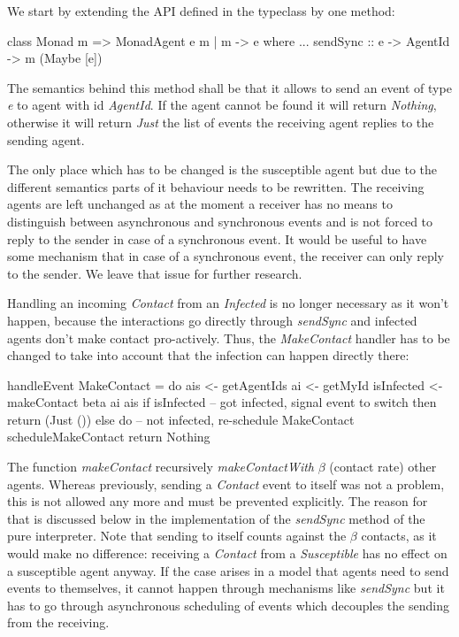 We start by extending the API defined in the typeclass by one method:

\begin{HaskellCode}
class Monad m => MonadAgent e m | m -> e where
  ...
  sendSync :: e -> AgentId -> m (Maybe [e])
\end{HaskellCode}

The semantics behind this method shall be that it allows to send an event of type \textit{e} to agent with id \textit{AgentId}. If the agent cannot be found it will return \textit{Nothing}, otherwise it will return \textit{Just} the list of events the receiving agent replies to the sending agent. 

The only place which has to be changed is the susceptible agent but due to the different semantics parts of it behaviour needs to be rewritten. The receiving agents are left unchanged as at the moment a receiver has no means to distinguish between asynchronous and synchronous events and is not forced to reply to the sender in case of a synchronous event. It would be useful to have some mechanism that in case of a synchronous event, the receiver can only reply to the sender. We leave that issue for further research.

Handling an incoming \textit{Contact} from an \textit{Infected} is no longer necessary as it won't happen, because the interactions go directly through \textit{sendSync} and infected agents don't make contact pro-actively. Thus, the \textit{MakeContact} handler has to be changed to take into account that the infection can happen directly there:

\begin{HaskellCode}
handleEvent MakeContact = do
  ais        <- getAgentIds
  ai         <- getMyId
  isInfected <- makeContact beta ai ais
  if isInfected
    -- got infected, signal event to switch
    then return (Just ())
    else do
      -- not infected, re-schedule MakeContact
      scheduleMakeContact
      return Nothing
\end{HaskellCode}

The function \textit{makeContact} recursively \textit{makeContactWith} $\beta$ (contact rate) other agents. Whereas previously, sending a \textit{Contact} event to itself was not a problem, this is not allowed any more and must be prevented explicitly. The reason for that is discussed below in the implementation of the \textit{sendSync} method of the pure interpreter. Note that sending to itself counts against the $\beta$ contacts, as it would make no difference: receiving a \textit{Contact} from a \textit{Susceptible} has no effect on a susceptible agent anyway. If the case arises in a model that agents need to send events to themselves, it cannot happen through mechanisms like \textit{sendSync} but it has to go through asynchronous scheduling of events which decouples the sending from the receiving.


